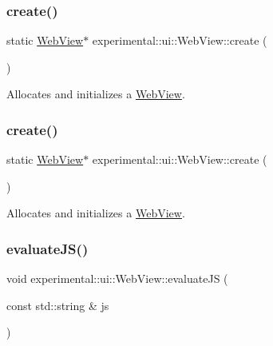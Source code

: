 \subsubsection{\texorpdfstring{create()}{create()}\hspace{0.1cm}{\footnotesize\ttfamily [1/2]}}
{\footnotesize\ttfamily static \hyperlink{classexperimental_1_1ui_1_1WebView}{Web\+View}$\ast$ experimental\+::ui\+::\+Web\+View\+::create (\begin{DoxyParamCaption}{ }\end{DoxyParamCaption})\hspace{0.3cm}{\ttfamily [static]}}

Allocates and initializes a \hyperlink{classexperimental_1_1ui_1_1WebView}{Web\+View}. \mbox{\label{classexperimental_1_1ui_1_1WebView_aac00e7ed03953cdfc444c04aa33c61a8}} 
\subsubsection{\texorpdfstring{create()}{create()}\hspace{0.1cm}{\footnotesize\ttfamily [2/2]}}
{\footnotesize\ttfamily static \hyperlink{classexperimental_1_1ui_1_1WebView}{Web\+View}$\ast$ experimental\+::ui\+::\+Web\+View\+::create (\begin{DoxyParamCaption}{ }\end{DoxyParamCaption})\hspace{0.3cm}{\ttfamily [static]}}

Allocates and initializes a \hyperlink{classexperimental_1_1ui_1_1WebView}{Web\+View}. \mbox{\label{classexperimental_1_1ui_1_1WebView_a5466fbae9364856565b8f4a6efa68ceb}} 
\subsubsection{\texorpdfstring{evaluate\+J\+S()}{evaluateJS()}\hspace{0.1cm}{\footnotesize\ttfamily [1/2]}}
{\footnotesize\ttfamily void experimental\+::ui\+::\+Web\+View\+::evaluate\+JS (\begin{DoxyParamCaption}\item[{const std\+::string \&}]{js }\end{DoxyParamCaption})}

